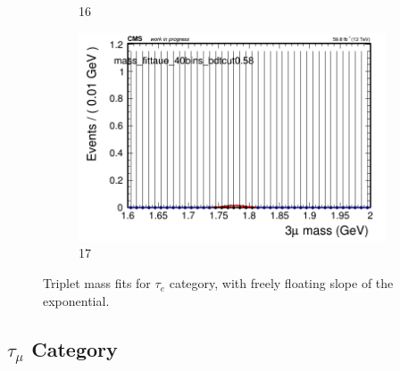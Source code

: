 \begin{figure}[h!]
\begin{subfigure}{0.2\textwidth}
        \caption{16}
    \end{subfigure}
    \begin{subfigure}{0.2\textwidth}
        \includegraphics[width=\textwidth]{unfixed_exp/plots/taue/massfit_taue_40bins_bdtcut0.58.png}
        \caption{17}
    \end{subfigure}
    \caption{Triplet mass fits for $\tau_{e}$ category, with freely floating slope of the exponential.}
    \label{fig:unfixed_taue}
\end{figure}


\newpage

\subsection{$\tau_{\mu}$ Category}
\label{sec:taumu}

